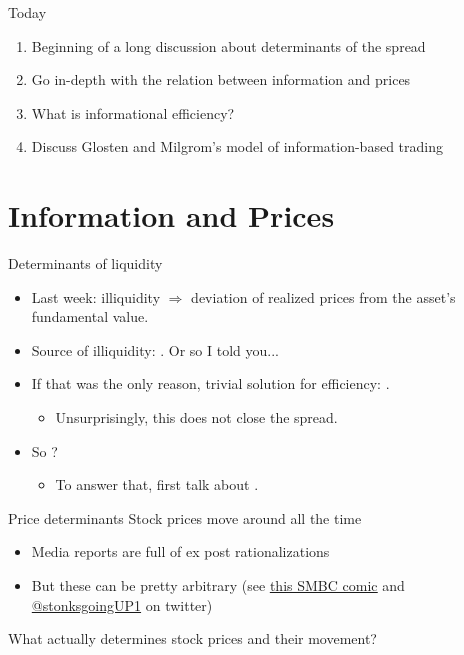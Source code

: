 \documentclass[english,10pt
,aspectratio=169
]{beamer}
\begin{document}
\begin{frame}{Today}
\begin{enumerate}
	\item Beginning of a long discussion about determinants of the spread
	\item Go in-depth with the relation between information and prices
	\item What is informational efficiency?
	\item Discuss Glosten and Milgrom's model of information-based trading
\end{enumerate}
\end{frame}



\section{Information and Prices}

\begin{frame}{Determinants of liquidity}
	\begin{itemize}[<+->]
		\item Last week: \alert{illiquidity} $\Rightarrow$ deviation of realized prices from the asset's fundamental value.
		\item Source of illiquidity: . Or so I told you...
		\item If that was the only reason, trivial solution for efficiency: \visible<handout:0>{add many dealers}.
		\begin{itemize}
			\item Unsurprisingly, this does not close the spread.
		\end{itemize}
		\item So ?
		\begin{itemize}
			\item To answer that, first talk about .
		\end{itemize}
	\end{itemize}
\end{frame}


\begin{frame}{Price determinants}
	Stock prices move around all the time
	\begin{itemize}
		\item Media reports are full of ex post rationalizations 
		\item But these can be pretty arbitrary (see \href{https://www.smbc-comics.com/comic/markets}{\uline{this SMBC comic}} and \href{https://twitter.com/stonksgoingUP1}{@stonksgoingUP1} on twitter)
	\end{itemize}
	What actually determines stock prices and their movement?
\end{frame}
\end{document}
